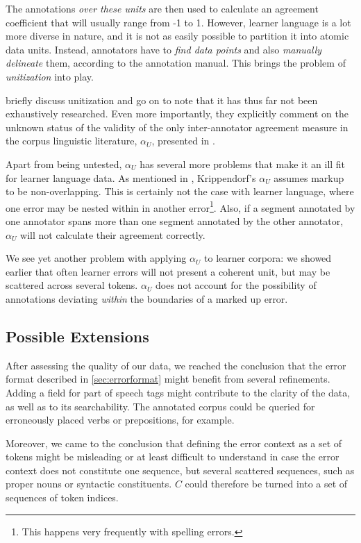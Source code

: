 \documentclass[12pt]{article}
\begin{document}
The annotations \textit{over these units} are then used to calculate an
agreement coefficient that will usually range from -1 to 1. However, learner
language is a lot more diverse in nature, and it is not as easily possible to
partition it into atomic data units. Instead, annotators have to \textit{find
data points} and also \textit{manually delineate} them, according to the
annotation manual. This brings the problem of \textit{unitization} into play.

\cite{ap2008} briefly discuss unitization and go on to note that it has thus far
not been exhaustively researched. Even more importantly, they explicitly comment
on the unknown status of the validity of the only inter-annotator agreement
measure in the corpus linguistic literature, $\alpha_U$, presented in
\cite{krip1995}.

Apart from being untested, $\alpha_U$ has several more problems that make it an
ill fit for learner language data. As mentioned in \cite{ap2008}, Krippendorf's
$\alpha_U$ assumes markup to be non-overlapping. This is certainly not the case
with learner language, where one error may be nested within in another
error\footnote{This happens very frequently with spelling errors.}. Also, if a
segment annotated by one annotator spans more than one segment annotated by the
other annotator, $\alpha_U$ will not calculate their agreement correctly.

We see yet another problem with applying $\alpha_U$ to learner corpora: we
showed earlier %
that often learner errors will not present a coherent unit, but may be scattered
across several tokens. $\alpha_U$ does not account for the possibility of
annotations deviating \textit{within} the boundaries of a marked up error.

\subsection{Possible Extensions}

After assessing the quality of our data, we reached
the conclusion that the error format described in \ref{sec:errorformat}
might benefit from several refinements. Adding a field for part of speech tags
might contribute to the clarity of the data, as well as to its searchability.
The annotated corpus could be queried for erroneously placed verbs or
prepositions, for example.

Moreover, we came to the conclusion that defining the error context as a set of
tokens might be misleading or at least difficult to understand in case the error
context does not constitute one sequence, but several scattered sequences, such
as proper nouns or syntactic constituents. $C$ could therefore be turned into a
set of sequences of token indices.
\end{document}
